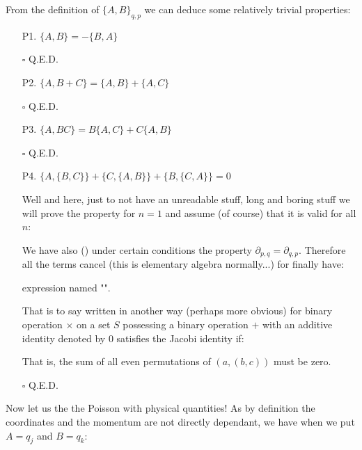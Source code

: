 	
	From the definition of $\{A,B\}_{q,p}$ we can deduce some relatively trivial properties:
	\begin{enumerate}
		\item[P1.] $\{A,B\}=-\{B,A\}$
		\begin{dem}
		
		\begin{flushright}
			$\square$  Q.E.D.
		\end{flushright}
		\end{dem}
		
		\item[P2.] $\{A,B+C\}=\{A,B\}+\{A,C\}$
		\begin{dem}
		
		\begin{flushright}
			$\square$  Q.E.D.
		\end{flushright}
		\end{dem}
		
		\item[P3.] $\{A,BC\}=B\{A,C\}+C\{A,B\}$
		\begin{dem}
		
		\begin{flushright}
			$\square$  Q.E.D.
		\end{flushright}
		\end{dem}	
		
		\item[P4.] $\{A,\{B,C\}\}+\{C,\{A,B\}\}+\{B,\{C,A\}\}=0$
		\begin{dem}
		 
		Well and here, just to not have an unreadable stuff, long and boring stuff we will prove the property for $n=1$ and assume (of course) that it is valid for all $n$:
		
		We have also () under certain conditions the property $\partial_{p,q}=\partial_{q,p}$. Therefore all the terms cancel (this is elementary algebra normally...) for finally have:
		
		expression named "\index{Jacobi identity}".
		
		That is to say written in another way (perhaps more obvious) for  binary operation $\times$ on a set $S$ possessing a binary operation $+$ with an additive identity denoted by $0$ satisfies the Jacobi identity if:
		
		That is, the sum of all even permutations of $(a,(b,c))$ must be zero.
		
		\begin{flushright}
			$\square$  Q.E.D.
		\end{flushright}
		\end{dem}
	\end{enumerate}
	Now let us the the Poisson with physical quantities! As by definition the coordinates and the momentum are not directly dependant, we have when we put $A=q_j$ and $B=q_k$:
	
